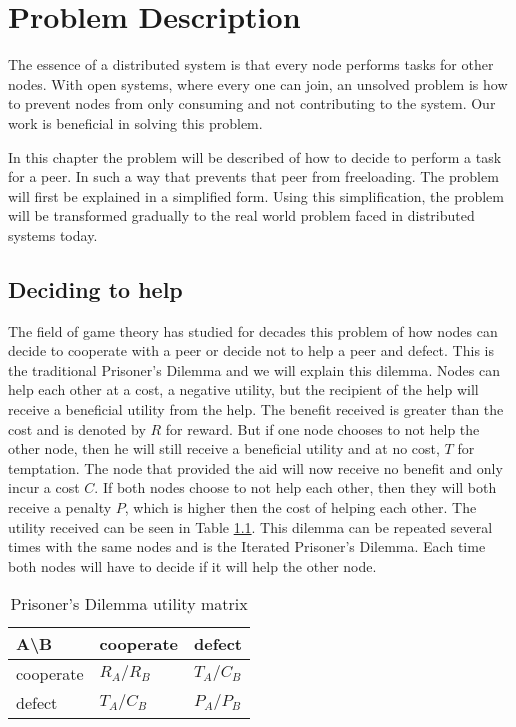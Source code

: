 \chapter{Problem Description}
The essence of a distributed system is that every node performs tasks for other nodes.
With open systems, where every one can join, an unsolved problem is how to prevent nodes
from only consuming and not contributing to the system.
Our work is beneficial in solving this problem.

In this chapter the problem will be described of how to decide to perform a task for a peer.
In such a way that prevents that peer from freeloading.
The problem will first be explained in a simplified form.
Using this simplification, the problem will be transformed gradually
to the real world problem faced in distributed systems today.

\section{Deciding to help}
The field of game theory has studied for decades this problem of how
nodes can decide to cooperate with a peer or decide not to help a peer and defect.
This is the traditional Prisoner's Dilemma 
and we will explain this dilemma\cite{Nowak-PrisonerDilemma}\cite{Lai-Incentives}.
Nodes can help each other at a cost, a negative utility, 
but the recipient of the help will receive a beneficial utility from the help.
The benefit received is greater than the cost and is denoted by $R$ for reward.
But if one node chooses to not help the other node,
 then he will still receive a beneficial utility and at no cost, $T$ for temptation.
The node that provided the aid will now receive no benefit and only incur a cost $C$.
If both nodes choose to not help each other, 
then they will both receive a penalty $P$, which is higher then the cost of helping each other.
The utility received can be seen in Table \ref{tab:pd-um}.
This dilemma can be repeated several times with the same nodes and is the Iterated Prisoner's Dilemma.
Each time both nodes will have to decide if it will help the other node.

\begin{table}
\center
	\begin{tabular}{l|ll}
	A\textbackslash B       & cooperate  & defect     \\ \hline
	cooperate & $R_A /R_B$ & $T_A /C_B$ \\
	defect    & $T_A /C_B$ & $P_A /P_B$
	\end{tabular}
\caption{Prisoner's Dilemma utility matrix}
\label{tab:pd-um}
\end{table}

